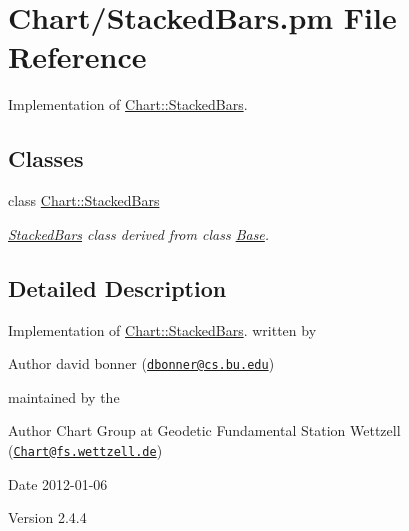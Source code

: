 \hypertarget{StackedBars_8pm}{
\section{Chart/StackedBars.pm File Reference}
\label{StackedBars_8pm}
}


Implementation of \hyperlink{classChart_1_1StackedBars}{Chart::StackedBars}.  


\subsection*{Classes}
\begin{DoxyCompactItemize}
\item 
class \hyperlink{classChart_1_1StackedBars}{Chart::StackedBars}
\begin{DoxyCompactList}\small\item\em \hyperlink{classChart_1_1StackedBars}{StackedBars} class derived from class \hyperlink{classChart_1_1Base}{Base}. \item\end{DoxyCompactList}\end{DoxyCompactItemize}


\subsection{Detailed Description}
Implementation of \hyperlink{classChart_1_1StackedBars}{Chart::StackedBars}. written by \begin{DoxyAuthor}{Author}
david bonner (\href{mailto:dbonner@cs.bu.edu}{\tt dbonner@cs.bu.edu})
\end{DoxyAuthor}
maintained by the \begin{DoxyAuthor}{Author}
Chart Group at Geodetic Fundamental Station Wettzell (\href{mailto:Chart@fs.wettzell.de}{\tt Chart@fs.wettzell.de}) 
\end{DoxyAuthor}
\begin{DoxyDate}{Date}
2012-\/01-\/06 
\end{DoxyDate}
\begin{DoxyVersion}{Version}
2.4.4 
\end{DoxyVersion}
